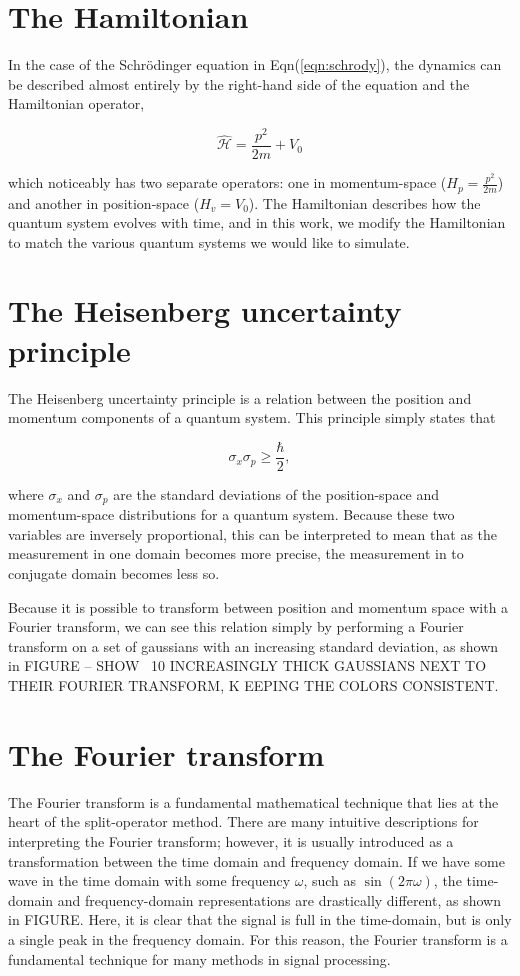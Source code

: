 \section{The Hamiltonian}

In the case of the Schr\"odinger equation in Eqn(\ref{eqn:schrody}), the dynamics can be described almost entirely by the right-hand side of the equation and the Hamiltonian operator,

\begin{equation}
\mathcal{\hat H} = \frac{p^2}{2m} + V_0
\end{equation}

\noindent which noticeably has two separate operators: one in momentum-space ($H_p = \frac{p^2}{2m}$) and another in position-space ($H_v = V_0$).
The Hamiltonian describes how the quantum system evolves with time, and in this work, we modify the Hamiltonian to match the various quantum systems we would like to simulate.

\section{The Heisenberg uncertainty principle}

The Heisenberg uncertainty principle is a relation between the position and momentum components of a quantum system.
This principle simply states that

$$
\sigma_x \sigma_p \geq \frac{\hbar}{2},
$$

where $\sigma_x$ and $\sigma_p$ are the standard deviations of the position-space and momentum-space distributions for a quantum system.
Because these two variables are inversely proportional, this can be interpreted to mean that as the measurement in one domain becomes more precise, the measurement in to conjugate domain becomes less so.

Because it is possible to transform between position and momentum space with a Fourier transform, we can see this relation simply by performing a Fourier transform on a set of gaussians with an increasing standard deviation, as shown in FIGURE -- SHOW ~10 INCREASINGLY THICK GAUSSIANS NEXT TO THEIR FOURIER TRANSFORM, K
EEPING THE COLORS CONSISTENT.

\section{The Fourier transform}

The Fourier transform is a fundamental mathematical technique that lies at the heart of the split-operator method.
There are many intuitive descriptions for interpreting the Fourier transform; however, it is usually introduced as a transformation between the time domain and frequency domain.
If we have some wave in the time domain with some frequency $\omega$, such as $\sin(2\pi\omega)$, the time-domain and frequency-domain representations are drastically different, as shown in FIGURE.
Here, it is clear that the signal is full in the time-domain, but is only a single peak in the frequency domain.
For this reason, the Fourier transform is a fundamental technique for many methods in signal processing.

